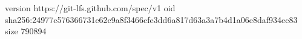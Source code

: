 version https://git-lfs.github.com/spec/v1
oid sha256:24977c576366731e62c9a8f3466cfe3dd6a817d63a3a7b4d1a06e8daf934ec83
size 790894

